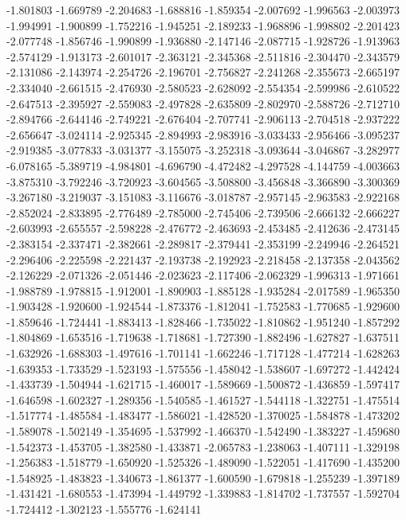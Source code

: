 -1.801803
-1.669789
-2.204683
-1.688816
-1.859354
-2.007692
-1.996563
-2.003973
-1.994991
-1.900899
-1.752216
-1.945251
-2.189233
-1.968896
-1.998802
-2.201423
-2.077748
-1.856746
-1.990899
-1.936880
-2.147146
-2.087715
-1.928726
-1.913963
-2.574129
-1.913173
-2.601017
-2.363121
-2.345368
-2.511816
-2.304470
-2.343579
-2.131086
-2.143974
-2.254726
-2.196701
-2.756827
-2.241268
-2.355673
-2.665197
-2.334040
-2.661515
-2.476930
-2.580523
-2.628092
-2.554354
-2.599986
-2.610522
-2.647513
-2.395927
-2.559083
-2.497828
-2.635809
-2.802970
-2.588726
-2.712710
-2.894766
-2.644146
-2.749221
-2.676404
-2.707741
-2.906113
-2.704518
-2.937222
-2.656647
-3.024114
-2.925345
-2.894993
-2.983916
-3.033433
-2.956466
-3.095237
-2.919385
-3.077833
-3.031377
-3.155075
-3.252318
-3.093644
-3.046867
-3.282977
-6.078165
-5.389719
-4.984801
-4.696790
-4.472482
-4.297528
-4.144759
-4.003663
-3.875310
-3.792246
-3.720923
-3.604565
-3.508800
-3.456848
-3.366890
-3.300369
-3.267180
-3.219037
-3.151083
-3.116676
-3.018787
-2.957145
-2.963583
-2.922168
-2.852024
-2.833895
-2.776489
-2.785000
-2.745406
-2.739506
-2.666132
-2.666227
-2.603993
-2.655557
-2.598228
-2.476772
-2.463693
-2.453485
-2.412636
-2.473145
-2.383154
-2.337471
-2.382661
-2.289817
-2.379441
-2.353199
-2.249946
-2.264521
-2.296406
-2.225598
-2.221437
-2.193738
-2.192923
-2.218458
-2.137358
-2.043562
-2.126229
-2.071326
-2.051446
-2.023623
-2.117406
-2.062329
-1.996313
-1.971661
-1.988789
-1.978815
-1.912001
-1.890903
-1.885128
-1.935284
-2.017589
-1.965350
-1.903428
-1.920600
-1.924544
-1.873376
-1.812041
-1.752583
-1.770685
-1.929600
-1.859646
-1.724441
-1.883413
-1.828466
-1.735022
-1.810862
-1.951240
-1.857292
-1.804869
-1.653516
-1.719638
-1.718681
-1.727390
-1.882496
-1.627827
-1.637511
-1.632926
-1.688303
-1.497616
-1.701141
-1.662246
-1.717128
-1.477214
-1.628263
-1.639353
-1.733529
-1.523193
-1.575556
-1.458042
-1.538607
-1.697272
-1.442424
-1.433739
-1.504944
-1.621715
-1.460017
-1.589669
-1.500872
-1.436859
-1.597417
-1.646598
-1.602327
-1.289356
-1.540585
-1.461527
-1.544118
-1.322751
-1.475514
-1.517774
-1.485584
-1.483477
-1.586021
-1.428520
-1.370025
-1.584878
-1.473202
-1.589078
-1.502149
-1.354695
-1.537992
-1.466370
-1.542490
-1.383227
-1.459680
-1.542373
-1.453705
-1.382580
-1.433871
-2.065783
-1.238063
-1.407111
-1.329198
-1.256383
-1.518779
-1.650920
-1.525326
-1.489090
-1.522051
-1.417690
-1.435200
-1.548925
-1.483823
-1.340673
-1.861377
-1.600590
-1.679818
-1.255239
-1.397189
-1.431421
-1.680553
-1.473994
-1.449792
-1.339883
-1.814702
-1.737557
-1.592704
-1.724412
-1.302123
-1.555776
-1.624141
